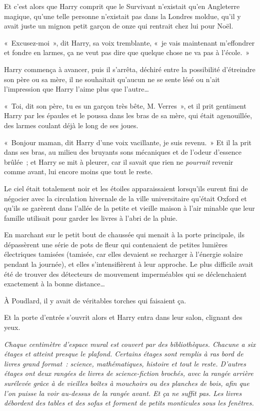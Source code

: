 Et c'est alors que Harry comprit que le Survivant n'existait qu'en Angleterre magique, qu'une telle personne n'existait pas dans la Londres moldue, qu'il y avait juste un mignon petit garçon de onze qui rentrait chez lui pour Noël.

«~Excusez-moi~», dit Harry, sa voix tremblante, «~je vais maintenant m'effondrer et fondre en larmes, ça ne veut pas dire que quelque chose ne va pas à l'école.~»

Harry commença à avancer, puis il s'arrêta, déchiré entre la possibilité d'étreindre son père ou sa mère, il ne souhaitait qu'aucun ne se sente lésé ou n'ait l'impression que Harry l'aime plus que l'autre…

«~Toi, dit son père, tu es un garçon très bête, M. Verres~», et il prit gentiment Harry par les épaules et le poussa dans les bras de sa mère, qui était agenouillée, des larmes coulant déjà le long de ses joues.

«~Bonjour maman, dit Harry d'une voix vacillante, je suis revenu.~»
Et il la prit dans ses bras, au milieu des bruyants sons mécaniques et de l'odeur d'essence brûlée~; et Harry se mit à pleurer, car il savait que rien ne \emph{pourrait} revenir comme avant, lui encore moins que tout le reste.

\later

Le ciel était totalement noir et les étoiles apparaissaient lorsqu'ils eurent fini de négocier avec la circulation hivernale de la ville universitaire qu'était Oxford et qu'ils se garèrent dans l'allée de la petite et vieille maison à l'air minable que leur famille utilisait pour garder les livres à l'abri de la pluie.

En marchant sur le petit bout de chaussée qui menait à la porte principale, ils dépassèrent une série de pots de fleur qui contenaient de petites lumières électriques tamisées (tamisée, car elles devaient se recharger à l'énergie solaire pendant la journée), et elles s'intensifièrent à leur approche.
Le plus difficile avait été de trouver des détecteurs de mouvement imperméables qui se déclenchaient exactement à la bonne distance…

À Poudlard, il y avait de véritables torches qui faisaient ça.

Et la porte d'entrée s'ouvrit alors et Harry entra dans leur salon, clignant des yeux.

\emph{Chaque centimètre d'espace mural est couvert par des bibliothèques.
Chacune a six étages et atteint presque le plafond.
Certains étages sont remplis à ras bord de livres grand format~: science, mathématiques, histoire et tout le reste.
D'autres étages ont deux rangées de livres de science-fiction brochés, avec la rangée arrière surélevée grâce à de vieilles boîtes à mouchoirs ou des planches de bois, afin que l'on puisse la voir au-dessus de la rangée avant.
Et ça ne suffit pas.
Les livres débordent des tables et des sofas et forment de petits monticules sous les fenêtres.}

